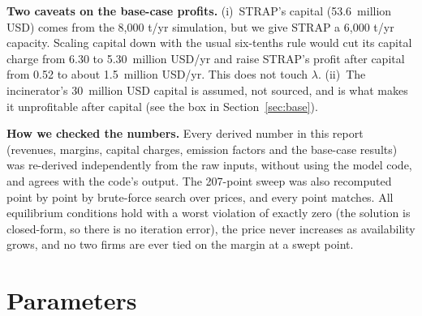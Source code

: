 \documentclass[11pt]{article}
\newcommand{\usd}{USD}
\begin{document}
\textbf{Two caveats on the base-case profits.}
(i)~STRAP's capital (53.6~million \usd) comes from the 8{,}000 t/yr simulation, but we give
STRAP a 6{,}000 t/yr capacity. Scaling capital down with the usual six-tenths
rule would cut its capital charge from 6.30 to 5.30~million \usd/yr and raise STRAP's
profit after capital from 0.52 to about 1.5~million \usd/yr. This does not touch
$\lambda$. (ii)~The incinerator's 30~million \usd{} capital is assumed, not sourced, and is
what makes it unprofitable after capital (see the box in Section~\ref{sec:base}).

\textbf{How we checked the numbers.}
Every derived number in this report (revenues, margins, capital charges,
emission factors and the base-case results) was re-derived independently from the
raw inputs, without using the model code, and agrees with the code's output.
The 207-point sweep was also recomputed point by point by brute-force search
over prices, and every point matches. All equilibrium conditions hold with a
worst violation of exactly zero (the solution is closed-form, so there is no
iteration error), the price never increases as availability grows, and no two
firms are ever tied on the margin at a swept point.

\clearpage
\appendix
\section{Parameters}
\end{document}
